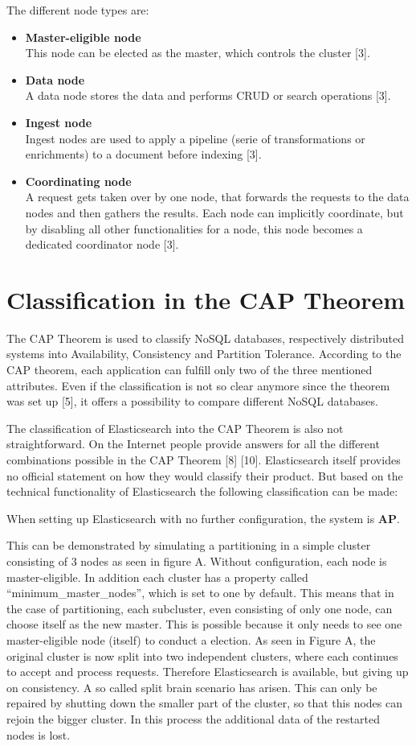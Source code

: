 The different node types are:
\begin{itemize}
    \item \textbf{Master-eligible node} \\ This node can be elected as the master, which controls the cluster [3].
    \item \textbf{Data node} \\ A data node stores the data and performs CRUD or search operations [3].
    \item \textbf{Ingest node} \\ Ingest nodes are used to apply a pipeline (serie of transformations or enrichments) to a document before indexing [3].
    \item \textbf{Coordinating node} \\ A request gets taken over by one node, that forwards the requests to the data nodes and then gathers the results. Each node can implicitly coordinate, but by disabling all other functionalities for a node, this node becomes a dedicated coordinator node [3].
\end{itemize}

\section{Classification in the CAP Theorem}
The CAP Theorem is used to classify NoSQL databases, respectively distributed systems into Availability, Consistency and Partition Tolerance. According to the CAP theorem, each application can fulfill only two of the three mentioned attributes. Even if the classification is not so clear anymore since the theorem was set up [5], it offers a possibility to compare different NoSQL databases.
 
The classification of Elasticsearch into the CAP Theorem is also not straightforward. On the Internet people provide answers for all the different combinations possible in the CAP Theorem [8] [10]. Elasticsearch itself provides no official statement on how they would classify their product. But based on the technical functionality of Elasticsearch the following classification can be made:

When setting up Elasticsearch with no further configuration, the system is \textbf{AP}. 

This can be demonstrated by simulating a partitioning in a simple cluster consisting of 3 nodes as seen in figure A. Without configuration, each node is master-eligible. In addition each cluster has a property called “minimum_master_nodes”, which is set to one by default. This means that in the case of partitioning, each subcluster, even consisting of only one node, can choose itself as the new master. This is possible because it only needs to see one master-eligible node (itself) to conduct a election. As seen in Figure A, the original cluster is now split into two independent clusters, where each continues to accept and process requests. Therefore Elasticsearch is available, but giving up on consistency. A so called split brain scenario has arisen. This can only be repaired by shutting down the smaller part of the cluster, so that this nodes can rejoin the bigger cluster. In this process the additional data of the restarted nodes is lost.


